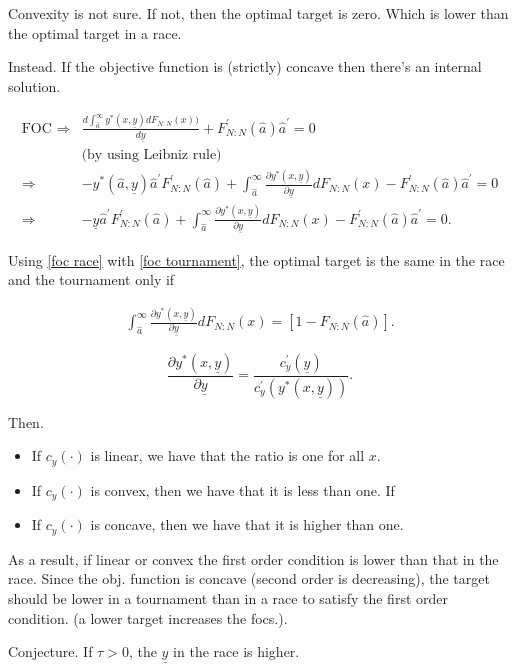 \documentclass[12pt,]{article}
\theoremstyle{plain} %
\newcommand\target{\underline{y}}
\newcommand\mtype{\hat{a}}
\newcommand\dystar{\frac{\partial y^*(x,\target)}{\partial\target}dF_{N:N}(x)}
\begin{document}
Convexity is not sure. If not, then the optimal target is zero. Which is
lower than the optimal target in a race.

Instead. If the objective function is (strictly) concave then there's an
internal solution.

\begin{align} \label{foc tournament}
  \text{FOC } \Rightarrow & 
    \frac{d\int_{\mtype}^\infty y^*(x, \target) d F_{N:N}(x)) }{d \target}
      + F^\prime_{N:N}(\mtype) \mtype^\prime =0 \nonumber\\ 
    & \text{(by using Leibniz rule)}\nonumber\\
  \Rightarrow & - y^*(\mtype, \target) \mtype^\prime F^\prime_{N:N}(\mtype) 
      + \int_{\mtype}^\infty \dystar - F^\prime_{N:N}(\mtype) \mtype^\prime = 0\nonumber\\
  \Rightarrow & -\target \mtype^\prime F^\prime_{N:N}(\mtype) 
      + \int_{\mtype}^\infty \dystar - F^\prime_{N:N}(\mtype) \mtype^\prime = 0.
\end{align}

Using \eqref{foc race} with \eqref{foc tournament}, the optimal target
is the same in the race and the tournament only if

\begin{align} 
  \int_{\mtype}^\infty \dystar = [1- F_{N:N}(\mtype)].
\end{align}

\[
  \frac{\partial y^*(x, \target)}{\partial \target} = 
    \frac{c_y^\prime(\target)}{c_y^\prime(y^*(x, \target))}. 
\]

Then.

\begin{itemize}
\item
  If \(c_y(\cdot)\) is linear, we have that the ratio is one for all
  \(x\).
\item
  If \(c_y(\cdot)\) is convex, then we have that it is less than one. If
\item
  If \(c_y(\cdot)\) is concave, then we have that it is higher than one.
\end{itemize}

As a result, if linear or convex the first order condition is lower than
that in the race. Since the obj. function is concave (second order is
decreasing), the target should be lower in a tournament than in a race
to satisfy the first order condition. (a lower target increases the
focs.).

Conjecture. If \(\tau>0\), the \(\target\) in the race is higher.
\end{document}
